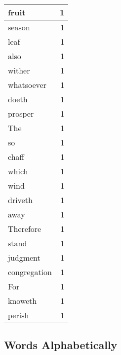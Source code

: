 \begin{center}
\begin{longtable}{l|r}
fruit & 1 \\ \hline
season & 1 \\ \hline
leaf & 1 \\ \hline
also & 1 \\ \hline
wither & 1 \\ \hline
whatsoever & 1 \\ \hline
doeth & 1 \\ \hline
prosper & 1 \\ \hline
The & 1 \\ \hline
so & 1 \\ \hline
chaff & 1 \\ \hline
which & 1 \\ \hline
wind & 1 \\ \hline
driveth & 1 \\ \hline
away & 1 \\ \hline
Therefore & 1 \\ \hline
stand & 1 \\ \hline
judgment & 1 \\ \hline
congregation & 1 \\ \hline
For & 1 \\ \hline
knoweth & 1 \\ \hline
perish & 1 \\ \hline
\end{longtable}
\end{center}



\normalsize



\subsection{Words Alphabetically}

